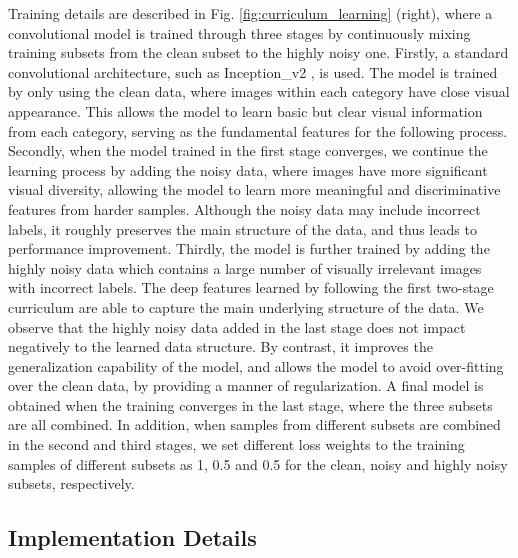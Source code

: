 \documentclass[runningheads]{llncs}
\begin{document}
Training details are described in Fig. \ref{fig:curriculum_learning} (right), where a convolutional model is trained through three stages by continuously mixing training subsets from the clean subset to the highly noisy one. Firstly, a standard convolutional architecture, such as Inception\_v2 \cite{ioffe2015batch}, is used. The model is trained by only using the clean data, where images within each category have close visual appearance. This allows the model to learn basic but clear visual information from each category, serving as the fundamental features for the following process. Secondly, when  the model trained in the first stage converges, we continue the learning process by adding the noisy data, where images have more significant visual diversity, allowing the model to learn more meaningful and discriminative features from harder samples. Although the noisy data may include incorrect labels, it roughly preserves the main structure of the data, and thus leads to performance improvement. Thirdly, the model is further trained by adding the highly noisy data which contains a large number of visually irrelevant images with incorrect labels. The deep features learned by following the first two-stage curriculum are able to capture the main underlying structure of the data. We observe that the highly noisy data added in the last stage does not impact negatively to the learned data structure. By contrast, it improves the generalization capability of the model, and allows the model to avoid over-fitting over the clean data, by providing a manner of regularization. A final model is obtained when the training  converges in the last stage, where the three subsets are all combined. In addition, when samples from different subsets are combined in the second and third stages, we set different loss weights to the training samples of different subsets as 1, 0.5 and 0.5 for the clean, noisy and highly noisy subsets, respectively.

\subsection{Implementation Details}
\end{document}
